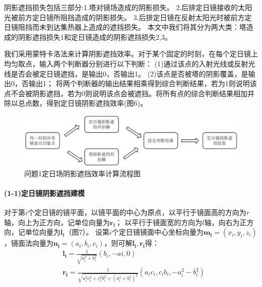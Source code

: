 \documentclass{article}
\numberwithin{equation}{subsection}
\begin{document}
阴影遮挡损失包括三部分\cite{3}:1.塔对镜场造成的阴影损失。
2.后排定日镜接收的太阳光被前方定日镜所阻挡造成的阴影损失。
3.后排定日镜在反射太阳光时被前方定日镜阻挡而未到达集热器上造成的遮挡损失。
本文中我们将其分为两大类：塔造成的阴影遮挡损失1和定日镜造成的阴影遮挡损失2,3。

我们采用蒙特卡洛法来计算阴影遮挡效率。对于某个固定的时刻，在每个定日镜上均匀取点，输入两个判断器分别进行以下判断：
(1)通过该点的入射光线或反射光线是否会被定日镜遮挡，是输出0，否输出1。
(2)该点是否被塔的阴影覆盖，是输出0，否输出1；
将两个判断器的输出结果相乘得到综合判断结果，若为1则说明该点不会被阴影遮挡，若为0则说明该点会被遮挡。将所有点的综合判断结果相加并除以总点数，得到定日镜阴影遮挡效率(图6)。

\begin{figure}[H]
    \centering
    \includegraphics[scale=0.4]{问题1-1阴影遮敝率建模.png}
    \caption{问题1定日场阴影遮挡效率计算流程图}
\end{figure}

\paragraph{(1-1)定日镜阴影遮挡建模}

对于第$i$个定日镜的镜平面，以镜平面的中心为原点，以平行于镜面高的方向为$r$轴，向上为正方向，记单位向量为$\bm{r_i}$；
以平行于镜面宽的方向为$l$轴，向右为正方向，记单位向量为$\bm{l_i}$（图7）。
设第$i$个定日镜镜面中心坐标向量为$\bm{m_i}=(x_i,y_i,z_i)$，镜面法向量为$\bm{n_i}=\left(a_i,b_i,c_i\right)$，则可解$\bm{l_i},\bm{r_i}$得：
\begin{equation}
    \begin{aligned}
        &\bm{l_i}=\frac{1}{\sqrt{a_i^2+b_i^2}}\left(b_i,-ai,0\right)\\
        &\bm{r_i}=\frac{1}{\sqrt{a_i^2c_i^2+c_i^2b_i^2+(a_i^2+b_i^2)^2}}\left(a_i c_i,c_i b_i ,-a_i^2-b_i^2\right)\\
    \end{aligned}
\end{equation}
\end{document}
